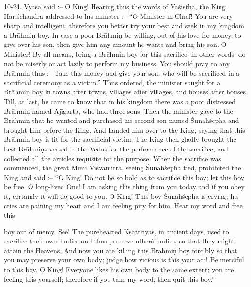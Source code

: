 10-24. Vy\=asa said :-- O King! Hearing thus the words of Va\'sistha, the King Hari\'schandra addressed to his minister :-- ``O Minister-in-Chief! You are very sharp and intelligent, therefore you better try your best and seek in my kingdom a Br\=ahmi\d{n} boy. In case a poor Br\=ahmi\d{n} be willing, out of his love for money, to give over his son, then give him any amount he wants and bring his son. O Minister! By all means, bring a Br\=ahmi\d{n} boy for this sacrifice; in other words, do not be miserly or act lazily to perform my business. You should pray to any Br\=ahmin thus :-- Take this money and give your son, who will be sacrificed in a sacrificial ceremony as a victim.'' Thus ordered, the minister sought for a Br\=ahmi\d{n} boy in towns after towns, villages after villages, and houses after houses. Till, at last, he came to know that in his kingdom there was a poor distressed Br\=ahmi\d{n} named Aj\={\i}garta, who had three sons. Then the minister gave to the Br\=ahmi\d{n} that he wanted and purchased his second son named \'Sunah\'sepha and brought him before the King. And handed him over to the King, saying that this Br\=ahmi\d{n} boy is fit for the sacrificial victim. The King then gladly brought the best Br\=ahmi\d{n}s versed in the Vedas for the performance of the sacrifice, and collected all the articles requisite for the purpose. When the sacrifice was commenced, the great Muni Vi\'sv\=amitra, seeing \'Sunah\'sepha tied, prohibited the King and said :-- ``O King! Do not be so bold as to sacrifice this boy; let this boy be free. O long-lived One! I am asking this thing from you today and if you obey it, certainly it will do good to you. O King! This boy \'Sunah\'sepha is crying; his cries are paining my heart and I am feeling pity for him. Hear my word and free this

boy out of mercy. See! The purehearted K\d{s}attriyas, in ancient days, used to sacrifice their own bodies and thus preserve other\'s bodies, so that they might attain the Heavens. And now you are killing this Br\=ahmi\d{n} boy forcibly so that you may preserve your own body; judge how vicious is this your act! Be merciful to this boy. O King! Everyone likes his own body to the same extent; you are feeling this yourself; therefore if you take my word, then quit this boy.''

